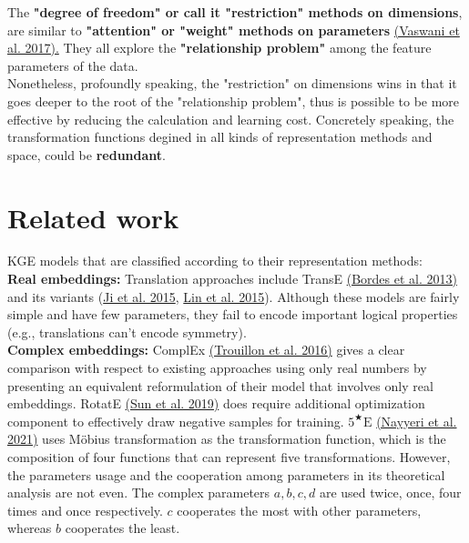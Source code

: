 \documentclass[9pt]{ctexart}
\theoremstyle{definition}
\begin{document}
The \textbf{"degree of freedom" or call it "restriction" methods on dimensions}, are similar to \textbf{"attention" or "weight" methods on parameters}
\hyperlink{Vas17}{(Vaswani et al. 2017).}
They all explore the \textbf{"relationship problem"} among the feature parameters of the data.\\
Nonetheless, profoundly speaking, the "restriction" on dimensions wins in that it goes deeper to the root of the "relationship problem", thus is possible to be more effective by reducing the calculation and learning cost.
Concretely speaking, the transformation functions degined in all kinds of representation methods and space, could be \textbf{redundant}.

\section{Related work}
KGE models that are classified according to their representation methods:\\
\textbf{Real embeddings:} Translation approaches include TransE 
\hyperlink{Bor13}{(Bordes et al. 2013)} 
and its variants 
(\hyperlink{Jie15}{Ji et al. 2015}, 
\hyperlink{Lin15}{Lin et al. 2015}).
Although these models are fairly simple and have few parameters, they fail to encode important logical properties (e.g., translations can't encode symmetry).\\
\textbf{Complex embeddings:} ComplEx \hyperlink{Tro16}{(Trouillon et al. 2016)} gives a clear comparison with respect to existing approaches using only real numbers by presenting an equivalent reformulation of their model that involves only real embeddings.
RotatE \hyperlink{Sun19}{(Sun et al. 2019)} does require additional optimization component to effectively draw negative samples for training.
$5^{\bigstar}\mathrm{E}$ 
\hyperlink{Nay21}{(Nayyeri et al. 2021)}
uses Möbius transformation as the transformation function, which is the composition of four functions that can represent five transformations. 
However, the parameters usage and the cooperation among parameters in its theoretical analysis are not even. 
The complex parameters $a, b, c, d$ are used twice, once, four times and once respectively.
$c$ cooperates the most with other parameters, whereas $b$ cooperates the least.
\end{document}
